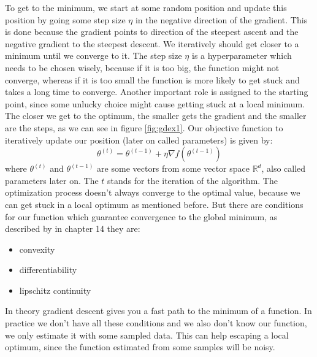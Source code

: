 \documentclass[aodsor,preprint]{imsart}
\numberwithin{equation}{section}
\theoremstyle{plain}
\begin{document}
To get to the minimum, we start at some random position and update this position by going some step size $\eta$ in the negative direction of the gradient. This is done because the gradient points to direction of the steepest ascent and the negative gradient to the steepest descent. We iteratively should get closer to a minimum until we converge to it. The step size $\eta$ is a hyperparameter which needs to be chosen wisely, because if it is too big, the function might not converge, whereas if it is too small the function is more likely to get stuck and takes a long time to converge. Another important role is assigned to the starting point, since some unlucky choice might cause getting stuck at a local minimum. The closer we get to the optimum, the smaller gets the gradient and the smaller are the steps, as we can see in figure \ref{fig:gdex1}. Our objective function to iteratively update our position (later on called parameters) is given by:
\begin{equation} \label{eq:gd}
\theta^{(t)} = \theta^{(t-1)} + \eta \nabla f(\theta^{(t-1)})
\end{equation}
where $\theta^{(t)}$ and $\theta^{(t-1)}$ are some vectors from some vector space $\mathbb{R}^d$, also called parameters later on. The $t$ stands for the iteration of the algorithm. The optimization process doesn't always converge to the optimal value, because we can get stuck in a local optimum as mentioned before. But there are conditions for our function which guarantee convergence to the global minimum, as described by \cite{shalev} in chapter 14 they are: 
\begin{itemize}
\item convexity
\item differentiability
\item lipschitz continuity
\end{itemize}

In theory gradient descent gives you a fast path to the minimum of a function. In practice we don't have all these conditions and we also don't know our function, we only estimate it with some sampled data. This can help escaping a local optimum, since the function estimated from some samples will be noisy.
\end{document}
